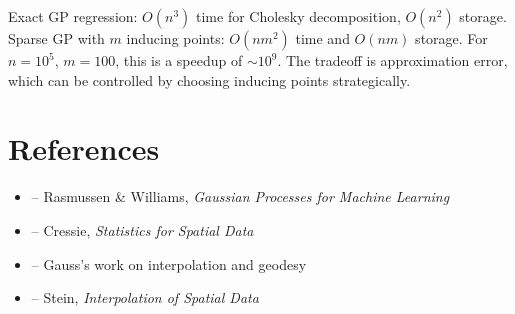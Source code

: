 \begin{solution}
Exact GP regression: $O(n^3)$ time for Cholesky decomposition, $O(n^2)$ storage. Sparse GP with $m$ inducing points: $O(nm^2)$ time and $O(nm)$ storage. For $n = 10^5$, $m = 100$, this is a speedup of $\sim 10^9$. The tradeoff is approximation error, which can be controlled by choosing inducing points strategically.
\end{solution}


\section{References}

\begin{itemize}
    \item \cite{rasmussen-williams} -- Rasmussen \& Williams, \textit{Gaussian Processes for Machine Learning}
    \item \cite{cressie} -- Cressie, \textit{Statistics for Spatial Data}
    \item \cite{gauss-theoria} -- Gauss's work on interpolation and geodesy
    \item \cite{stein} -- Stein, \textit{Interpolation of Spatial Data}
\end{itemize}